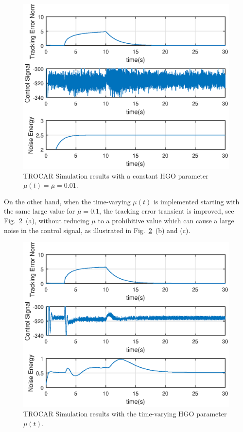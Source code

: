 \documentclass[letterpaper, 10 pt, conference]{ieeeconf}  %
\theoremstyle{plain}
\theoremstyle{definition}
\theoremstyle{remark}
\begin{document}
\begin{figure}[h!]
\begin{center}
\includegraphics[width = 13cm]{Figs/mu0dot01-30sec.eps}
\caption{TROCAR Simulation results with a constant HGO parameter $\mu(t)=\bar{\mu}\!=\!0.01$.}
\label{fig:timevarying2}
\end{center}
\end{figure}
%
On the other hand, when the time-varying $\mu(t)$ is implemented starting with the same large value for
$\bar{\mu}\!=\!0.1$,
the tracking error transient is improved, see Fig.~\ref{fig:timevarying3}~(a), without reducing $\mu$ to a prohibitive value which can cause a large noise in the control signal, as illustrated in Fig.~\ref{fig:timevarying3}~(b) and (c). 
%
\begin{figure}[h!]
\begin{center}
\includegraphics[width = 13cm]{Figs/muVar-30sec.eps}
\caption{TROCAR Simulation results with the time-varying HGO parameter $\mu(t)$.}
\label{fig:timevarying3}
\end{center}
\end{figure}
\end{document}
